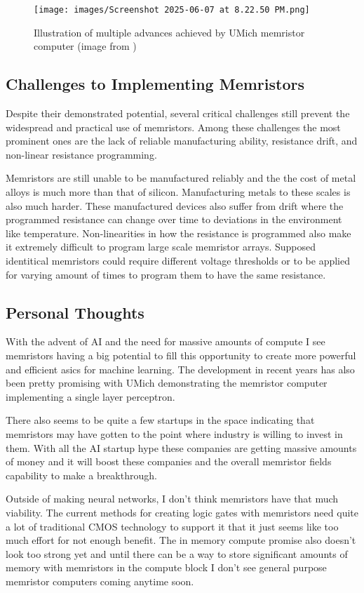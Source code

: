\documentclass[sigconf]{acmart}
\begin{document}
\begin{figure}[h]
  \centering
  \texttt{[image: images/Screenshot 2025-06-07 at 8.22.50 PM.png]}
  \caption{Illustration of multiple advances achieved by UMich memristor computer (image from \cite{cai2019fully})}
\end{figure}

\subsection{Challenges to Implementing Memristors}
Despite their demonstrated potential, several critical challenges still
prevent the widespread and practical use of memristors. Among these challenges
the most prominent ones are the lack of reliable manufacturing ability,
resistance drift, and non-linear resistance programming. 

Memristors are still unable to be manufactured reliably and the 
the cost of metal alloys is much more than that of silicon. Manufacturing 
metals to these scales is also much harder. These manufactured devices also 
suffer from drift where the programmed resistance can change over time 
to deviations in the environment like temperature. Non-linearities 
in how the resistance is programmed also make it extremely difficult to
program large scale memristor arrays. Supposed identitical memristors 
could require different voltage thresholds or to be applied for varying 
amount of times to program them to have the same resistance. 

\subsection{Personal Thoughts}
With the advent of AI and the need for massive amounts of compute 
I see memristors having a big potential to fill this opportunity 
to create more powerful and efficient asics for machine learning. 
The development in recent years has also been pretty promising with 
UMich demonstrating the memristor computer implementing a 
single layer perceptron. 

There also seems to be quite a few startups in the space
indicating that memristors may have gotten to the point where 
industry is willing to invest in them. With all the AI startup 
hype these companies are getting massive amounts of money 
and it will boost these companies and the overall memristor fields 
capability to make a breakthrough. 

Outside of making neural networks, I don't think memristors have 
that much viability. The current methods for creating logic gates 
with memristors need quite a lot of traditional CMOS technology to 
support it that it just seems like too much effort for not enough 
benefit. The in memory compute promise also doesn't look too strong
yet and until there can be a way to store significant amounts of memory with 
memristors in the compute block I don't see general purpose memristor 
computers coming anytime soon. 
\end{document}
